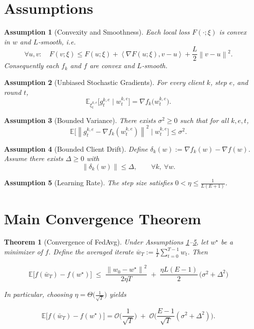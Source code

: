 \documentclass[11pt]{article}
\newtheorem{theorem}{Theorem}
\newtheorem{assumption}{Assumption}
\newcommand{\E}{\mathbb{E}}
\newcommand{\norm}[1]{\left\lVert#1\right\rVert}
\newcommand{\inner}[2]{\left\langle #1,#2\right\rangle}
\begin{document}
\newpage

\section*{Assumptions}
\begin{assumption}[Convexity and Smoothness]\label{ass:convex}
Each local loss $F(\cdot;\xi)$ is convex in $w$ and $L$‑smooth, i.e.
\[
\forall u,v:\quad
F(v;\xi)\le F(u;\xi)+\inner{\nabla F(u;\xi)}{v-u}
+\frac{L}{2}\norm{v-u}^2 .
\]
Consequently each $f_k$ and $f$ are convex and $L$‑smooth.
\end{assumption}

\begin{assumption}[Unbiased Stochastic Gradients]\label{ass:unbiased}
For every client $k$, step $e$, and round $t$,
\[
\E_{\xi_{t}^{k,e}}\!\big[g_{t}^{k,e}\mid w_{t}^{k,e}\big]=\nabla f_k\!\big(w_{t}^{k,e}\big).
\]
\end{assumption}

\begin{assumption}[Bounded Variance]\label{ass:variance}
There exists $\sigma^2\ge0$ such that for all $k,e,t$,
\[
\E\!\big[\norm{g_{t}^{k,e}-\nabla f_k(w_{t}^{k,e})}^2\mid w_{t}^{k,e}\big]\le\sigma^2 .
\]
\end{assumption}

\begin{assumption}[Bounded Client Drift]\label{ass:drift}
Define $\delta_k(w):=\nabla f_k(w)-\nabla f(w)$.  
Assume there exists $\Delta\ge0$ with
\[
\norm{\delta_k(w)}\le\Delta,\qquad\forall k,\ \forall w.
\]
\end{assumption}

\begin{assumption}[Learning Rate]\label{ass:lr}
The step size satisfies $0<\eta\le\frac{1}{L(E+1)}$.
\end{assumption}

\section*{Main Convergence Theorem}
\begin{theorem}[Convergence of FedAvg]\label{thm:main}
Under Assumptions \ref{ass:convex}–\ref{ass:lr}, let $w^\star$ be a minimizer of $f$.  
Define the averaged iterate $\displaystyle \bar w_T:=\frac1T\sum_{t=0}^{T-1} w_t$. Then

\[
\boxed{
\E\!\big[f(\bar w_T)-f(w^\star)\big]
\;\le\;
\frac{\norm{w_0-w^\star}^2}{2\eta T}
\;+\;
\frac{\eta L (E-1)}{2}\,\big(\sigma^2+\Delta^2\big)
}
\tag{1}
\]

In particular, choosing $\eta=\Theta\!\big(\tfrac{1}{\sqrt{T}}\big)$ yields  

\[
\E\!\big[f(\bar w_T)-f(w^\star)\big]=\mathcal{O}\!\Big(\frac{1}{\sqrt{T}}\Big)
\;+\;
\mathcal{O}\!\Big(\frac{E-1}{\sqrt{T}}(\sigma^2+\Delta^2)\Big).
\]
\end{theorem}
\end{document}
